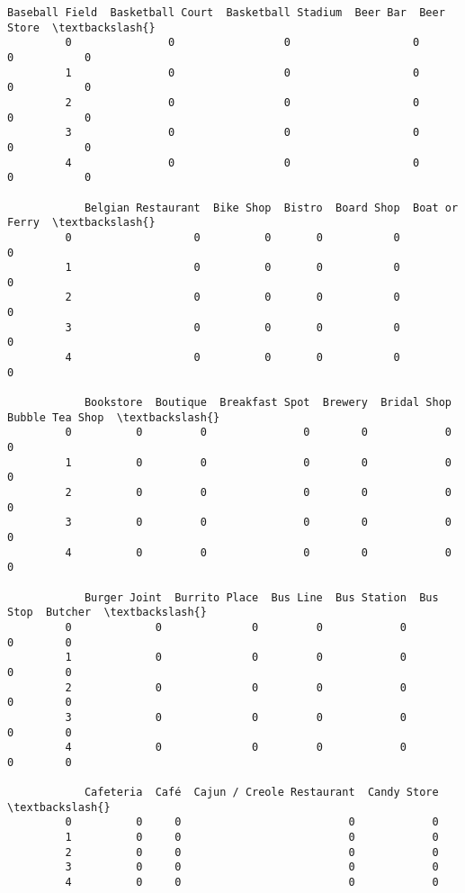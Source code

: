 \documentclass[11pt]{article}
\begin{document}
\begin{Verbatim}[commandchars=\\\{\}]
            Baseball Field  Basketball Court  Basketball Stadium  Beer Bar  Beer Store  \textbackslash{}
         0               0                 0                   0         0           0   
         1               0                 0                   0         0           0   
         2               0                 0                   0         0           0   
         3               0                 0                   0         0           0   
         4               0                 0                   0         0           0   
         
            Belgian Restaurant  Bike Shop  Bistro  Board Shop  Boat or Ferry  \textbackslash{}
         0                   0          0       0           0              0   
         1                   0          0       0           0              0   
         2                   0          0       0           0              0   
         3                   0          0       0           0              0   
         4                   0          0       0           0              0   
         
            Bookstore  Boutique  Breakfast Spot  Brewery  Bridal Shop  Bubble Tea Shop  \textbackslash{}
         0          0         0               0        0            0                0   
         1          0         0               0        0            0                0   
         2          0         0               0        0            0                0   
         3          0         0               0        0            0                0   
         4          0         0               0        0            0                0   
         
            Burger Joint  Burrito Place  Bus Line  Bus Station  Bus Stop  Butcher  \textbackslash{}
         0             0              0         0            0         0        0   
         1             0              0         0            0         0        0   
         2             0              0         0            0         0        0   
         3             0              0         0            0         0        0   
         4             0              0         0            0         0        0   
         
            Cafeteria  Café  Cajun / Creole Restaurant  Candy Store  \textbackslash{}
         0          0     0                          0            0   
         1          0     0                          0            0   
         2          0     0                          0            0   
         3          0     0                          0            0   
         4          0     0                          0            0   
         

\end{Verbatim}
\end{document}
